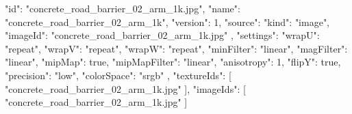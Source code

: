 {
  "id": "concrete_road_barrier_02_arm_1k.jpg",
  "name": "concrete_road_barrier_02_arm_1k",
  "version": 1,
  "source": {
    "kind": "image",
    "imageId": "concrete_road_barrier_02_arm_1k.jpg"
  },
  "settings": {
    "wrapU": "repeat",
    "wrapV": "repeat",
    "wrapW": "repeat",
    "minFilter": "linear",
    "magFilter": "linear",
    "mipMap": true,
    "mipMapFilter": "linear",
    "anisotropy": 1,
    "flipY": true,
    "precision": "low",
    "colorSpace": "srgb"
  },
  "textureIds": [
    "concrete_road_barrier_02_arm_1k.jpg"
  ],
  "imageIds": [
    "concrete_road_barrier_02_arm_1k.jpg"
  ]
}
